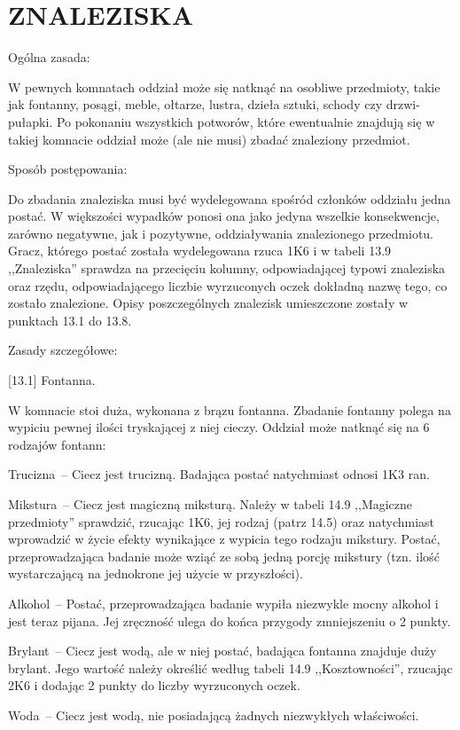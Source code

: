 \section{ZNALEZISKA}

Ogólna zasada:

W pewnych komnatach oddział może się natknąć na osobliwe przedmioty, takie jak fontanny, posągi, meble, ołtarze, lustra, dzieła sztuki, schody czy drzwi-pułapki.
Po pokonaniu wszystkich potworów, które ewentualnie znajdują się w takiej komnacie oddział może (ale nie musi) zbadać znaleziony przedmiot.

Sposób postępowania:

Do zbadania znaleziska musi być wydelegowana spośród członków oddziału jedna postać.
W większości wypadków ponosi ona jako jedyna wszelkie konsekwencje, zarówno negatywne, jak i pozytywne, oddziaływania znalezionego przedmiotu.
Gracz, którego postać została wydelegowana rzuca 1K6 i w tabeli 13.9 ,,Znaleziska'' sprawdza na przecięciu kolumny, odpowiadającej typowi znaleziska oraz rzędu, odpowiadającego liczbie wyrzuconych oczek dokładną nazwę tego, co zostało znalezione.
Opisy poszczególnych znalezisk umieszczone zostały w punktach 13.1 do 13.8.

Zasady szczegółowe:

[13.1] Fontanna.

W komnacie stoi duża, wykonana z brązu fontanna.
Zbadanie fontanny polega na wypiciu pewnej ilości tryskającej z niej cieczy.
Oddział może natknąć się na 6 rodzajów fontann:

Trucizna~-- Ciecz jest trucizną.
Badająca postać natychmiast odnosi 1K3 ran.

Mikstura~-- Ciecz jest magiczną miksturą.
Należy w tabeli 14.9 ,,Magiczne przedmioty'' sprawdzić, rzucając 1K6, jej rodzaj (patrz 14.5) oraz natychmiast wprowadzić w życie efekty wynikające z wypicia tego rodzaju mikstury.
Postać, przeprowadzająca badanie może wziąć ze sobą jedną porcję mikstury (tzn. ilość wystarczającą na jednokrone jej użycie w przyszłości).

Alkohol~-- Postać, przeprowadzająca badanie wypiła niezwykle mocny alkohol i jest teraz pijana.
Jej zręczność ulega do końca przygody zmniejszeniu o 2 punkty.

Brylant~-- Ciecz jest wodą, ale w niej postać, badająca fontanna znajduje duży brylant.
Jego wartość należy określić według tabeli 14.9 ,,Kosztowności'', rzucając 2K6 i dodając 2 punkty do liczby wyrzuconych oczek.

Woda~-- Ciecz jest wodą, nie posiadającą żadnych niezwykłych właściwości.

